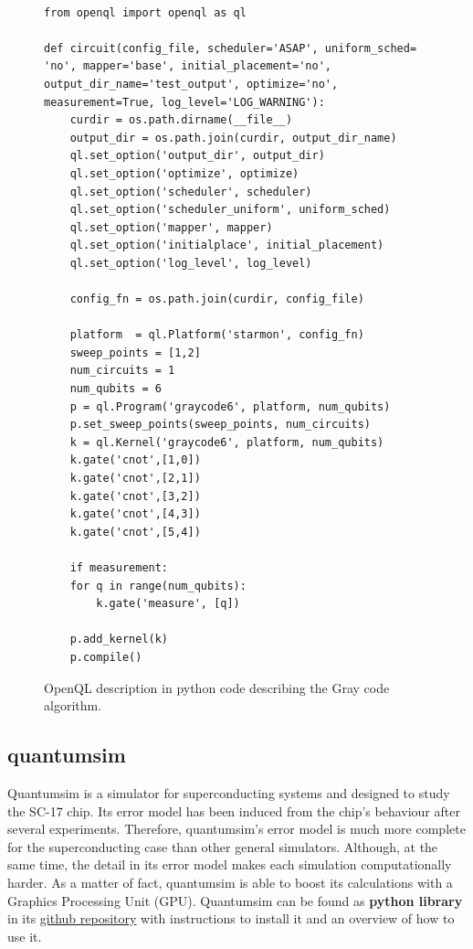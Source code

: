 \begin{figure}
\centering
\begin{minipage}{\textwidth}

\begin{verbatim}

from openql import openql as ql

def circuit(config_file, scheduler='ASAP', uniform_sched= 'no', mapper='base', initial_placement='no', output_dir_name='test_output', optimize='no', measurement=True, log_level='LOG_WARNING'):
    curdir = os.path.dirname(__file__)
    output_dir = os.path.join(curdir, output_dir_name)
    ql.set_option('output_dir', output_dir)
    ql.set_option('optimize', optimize)
    ql.set_option('scheduler', scheduler)
    ql.set_option('scheduler_uniform', uniform_sched)
    ql.set_option('mapper', mapper)
    ql.set_option('initialplace', initial_placement)
    ql.set_option('log_level', log_level)

    config_fn = os.path.join(curdir, config_file)

    platform  = ql.Platform('starmon', config_fn)
    sweep_points = [1,2]
    num_circuits = 1
    num_qubits = 6
    p = ql.Program('graycode6', platform, num_qubits)
    p.set_sweep_points(sweep_points, num_circuits)
    k = ql.Kernel('graycode6', platform, num_qubits)
    k.gate('cnot',[1,0])
    k.gate('cnot',[2,1])
    k.gate('cnot',[3,2])
    k.gate('cnot',[4,3])
    k.gate('cnot',[5,4])

    if measurement:
	for q in range(num_qubits):
	    k.gate('measure', [q])

    p.add_kernel(k)
    p.compile()

\end{verbatim}

\caption{OpenQL description in python code describing the Gray code algorithm.}
\label{code:openql_gray_code}
\end{minipage}
\end{figure}

\subsection*{quantumsim}
\label{sec:orge732141}

Quantumsim \cite{O_Brien_2017} is a simulator for superconducting systems and designed to study the SC-17 chip.
Its error model has been induced from the chip's behaviour after several experiments.
Therefore, quantumsim's error model is much more complete for the superconducting case than other general simulators.
Although, at the same time, the detail in its error model makes each simulation computationally harder.
As a matter of fact, quantumsim is able to boost its calculations with a Graphics Processing Unit (GPU).
Quantumsim can be found as \textbf{python library} in its \href{https://github.com/quantumsim/quantumsim}{github repository} with instructions to install it and an overview of how to use it.

